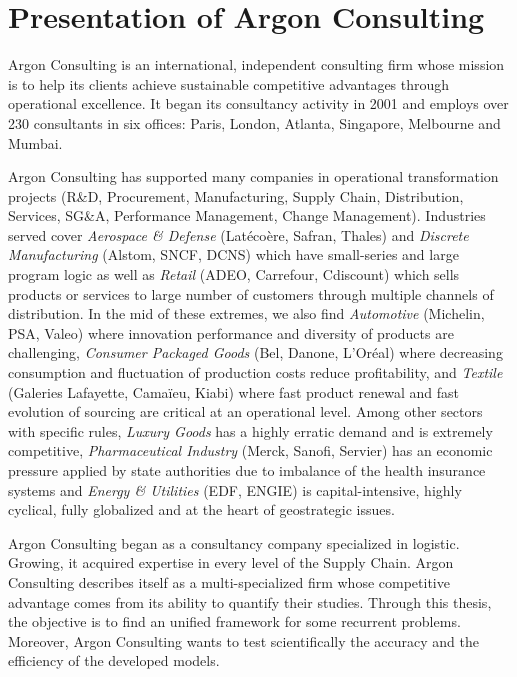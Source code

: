 \section{Presentation of Argon Consulting}


Argon Consulting is an international, independent consulting firm whose mission is to help its clients achieve sustainable competitive advantages through operational excellence.
It began its consultancy activity in 2001 and employs over 230 consultants in six offices: Paris, London, Atlanta, Singapore, Melbourne and Mumbai.


Argon Consulting has supported many companies in operational transformation projects (R\&D, Procurement, Manufacturing, Supply Chain, Distribution, Services, SG\&A, Performance Management, Change Management).
Industries served cover
\emph{Aerospace \& Defense} (Lat\'eco\`ere, Safran, Thales) and
\emph{Discrete Manufacturing} (Alstom, SNCF, DCNS) which have small-series and large program logic as well as
\emph{Retail} (ADEO, Carrefour, Cdiscount) which sells products or services to large number of customers through multiple channels of distribution.
In the mid of these extremes, we also find
\emph{Automotive} (Michelin, PSA, Valeo) where innovation performance and diversity of products are challenging,
\emph{Consumer Packaged Goods} (Bel, Danone, L'Oréal) where decreasing consumption and fluctuation of production costs reduce profitability, and
\emph{Textile} (Galeries Lafayette, Cama\"ieu, Kiabi) where fast product renewal and fast evolution of sourcing are critical at an operational level.
Among other sectors with specific rules,
\emph{Luxury Goods} has a highly erratic demand and is extremely competitive,
\emph{Pharmaceutical Industry} (Merck, Sanofi, Servier) has an economic pressure applied by state authorities due to imbalance of the health insurance systems and
\emph{Energy \& Utilities} (EDF, ENGIE) is capital-intensive, highly cyclical, fully globalized and at the heart of geostrategic issues.


Argon Consulting began as a consultancy company specialized in logistic.
Growing, it acquired expertise in every level of the Supply Chain.
Argon Consulting describes itself as a multi-specialized firm whose competitive advantage comes from its ability to quantify their studies.
Through this thesis, the objective is to find an unified framework for some recurrent problems.
Moreover, Argon Consulting wants to test scientifically the accuracy and the efficiency of the developed models.


